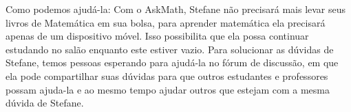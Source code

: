 Como podemos ajudá-la: Com o AskMath, Stefane não precisará mais levar seus livros de Matemática em sua bolsa, para aprender matemática ela precisar\'a apenas de um dispositivo móvel. Isso possibilita que ela possa continuar estudando no salão enquanto este estiver vazio. Para solucionar as dúvidas de Stefane, temos pessoas esperando para ajudá-la no f\'orum de discuss\~ao, em que ela pode compartilhar suas d\'uvidas para que outros estudantes e professores possam ajuda-la e ao mesmo tempo ajudar outros 
que estejam com a mesma d\'uvida de Stefane. 

